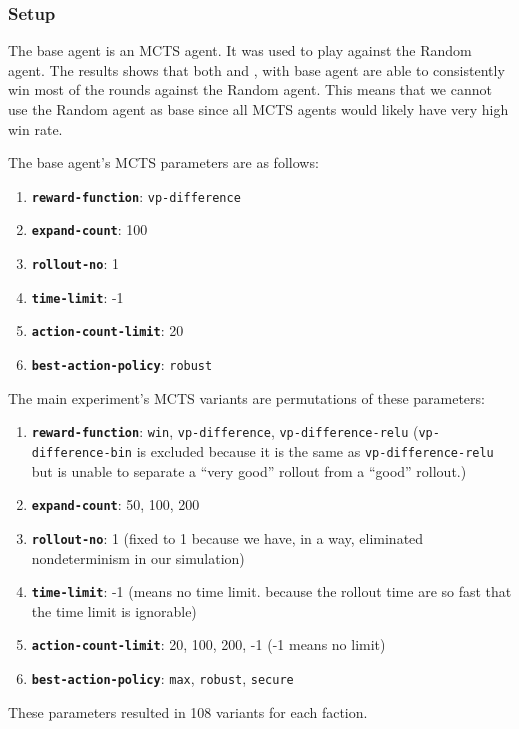 \subsubsection{Setup} \label{main-exp-setup}
The base agent is an MCTS agent. It was used to play against the Random agent. The results shows that both \Marquise{} and \Eyrie{}, with base agent are able to consistently win most of the rounds against the Random agent. This means that we cannot use the Random agent as base since all MCTS agents would likely have very high win rate.

The base agent's MCTS parameters are as follows:
\begin{enumerate}
    \item \textbf{\texttt{reward-function}}: \texttt{vp-difference}
    \item \textbf{\texttt{expand-count}}: 100
    \item \textbf{\texttt{rollout-no}}: 1
    \item \textbf{\texttt{time-limit}}: -1
    \item \textbf{\texttt{action-count-limit}}: 20
    \item \textbf{\texttt{best-action-policy}}: \texttt{robust}
\end{enumerate}

The main experiment's MCTS variants are permutations of these parameters:
\begin{enumerate}
    \item \textbf{\texttt{reward-function}}: \texttt{win}, \texttt{vp-difference}, \texttt{vp-difference-relu} (\texttt{vp-difference-bin} is excluded because it is the same as \texttt{vp-difference-relu} but is unable to separate a ``very good'' rollout from a ``good'' rollout.)
    \item \textbf{\texttt{expand-count}}: 50, 100, 200
    \item \textbf{\texttt{rollout-no}}: 1 (fixed to 1 because we have, in a way, eliminated nondeterminism in our simulation)
    \item \textbf{\texttt{time-limit}}: -1 (means no time limit. because the rollout time are so fast that the time limit is ignorable)
    \item \textbf{\texttt{action-count-limit}}: 20, 100, 200, -1 (-1 means no limit)
    \item \textbf{\texttt{best-action-policy}}: \texttt{max}, \texttt{robust}, \texttt{secure}
\end{enumerate}
These parameters resulted in 108 variants for each faction.

